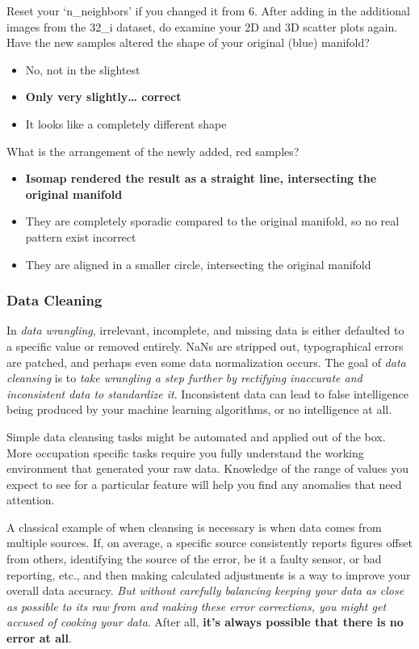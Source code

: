 \documentclass[11pt]{article}
\providecommand{\tightlist}{%
      \setlength{\itemsep}{0pt}\setlength{\parskip}{0pt}}
\begin{document}
Reset your `n\_neighbors' if you changed it from 6. After adding in the
additional images from the 32\_i dataset, do examine your 2D and 3D
scatter plots again. Have the new samples altered the shape of your
original (blue) manifold?

\begin{itemize}
\tightlist
\item
  No, not in the slightest
\item
  \textbf{Only very slightly\ldots{} correct}
\item
  It looks like a completely different shape
\end{itemize}

What is the arrangement of the newly added, red samples?

\begin{itemize}
\tightlist
\item
  \textbf{Isomap rendered the result as a straight line, intersecting
  the original manifold}
\item
  They are completely sporadic compared to the original manifold, so no
  real pattern exist incorrect
\item
  They are aligned in a smaller circle, intersecting the original
  manifold
\end{itemize}

    \hypertarget{data-cleaning}{%
\subsubsection{Data Cleaning}\label{data-cleaning}}

In \emph{data wrangling}, irrelevant, incomplete, and missing data is
either defaulted to a specific value or removed entirely. NaNs are
stripped out, typographical errors are patched, and perhaps even some
data normalization occurs. The goal of \emph{data cleansing} is to
\emph{take wrangling a step further by rectifying inaccurate and
inconsistent data to standardize it}. Inconsistent data can lead to
false intelligence being produced by your machine learning algorithms,
or no intelligence at all.

Simple data cleansing tasks might be automated and applied out of the
box. More occupation specific tasks require you fully understand the
working environment that generated your raw data. Knowledge of the range
of values you expect to see for a particular feature will help you find
any anomalies that need attention.

A classical example of when cleansing is necessary is when data comes
from multiple sources. If, on average, a specific source consistently
reports figures offset from others, identifying the source of the error,
be it a faulty sensor, or bad reporting, etc., and then making
calculated adjustments is a way to improve your overall data accuracy.
\emph{But without carefully balancing keeping your data as close as
possible to its raw from and making these error corrections, you might
get accused of cooking your data}. After all, \textbf{it's always
possible that there is no error at all}.
\end{document}
